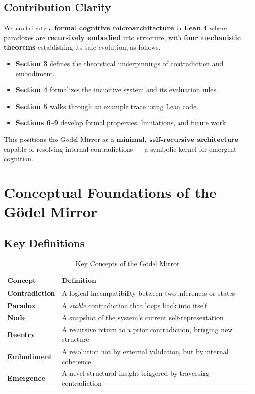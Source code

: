 \documentclass[manuscript,nonacm]{acmart}
\begin{document}
\subsection{Contribution Clarity}
We contribute a \textbf{formal cognitive microarchitecture} in \textbf{Lean 4} where paradoxes are \textbf{recursively embodied} into structure, with \textbf{four mechanistic theorems} establishing its safe evolution, as follows.

\begin{itemize}
\item \textbf{Section 3} defines the theoretical underpinnings of contradiction and embodiment.
\item \textbf{Section 4} formalizes the inductive system and its evaluation rules.
\item \textbf{Section 5} walks through an example trace using Lean code.
\item \textbf{Sections 6–9} develop formal properties, limitations, and future work.
\end{itemize}

This positions the Gödel Mirror as a \textbf{minimal, self-recursive architecture} capable of resolving internal contradictions — a symbolic kernel for emergent cognition.

\section{Conceptual Foundations of the Gödel Mirror}

\subsection{Key Definitions}

\begin{table}[H]
  \caption{Key Concepts of the Gödel Mirror}
  \label{tab:key-concepts}
  \begin{tabular}{@{}ll@{}}
    \toprule
    \textbf{Concept} & \textbf{Definition} \\
    \midrule
    \textbf{Contradiction} & A logical incompatibility between two inferences or states \\
    \textbf{Paradox} & A \textit{stable} contradiction that loops back into itself \\
    \textbf{Node} & A snapshot of the system's current self-representation \\
    \textbf{Reentry} & A recursive return to a prior contradiction, bringing new structure \\
    \textbf{Embodiment} & A resolution not by external validation, but by internal coherence \\
    \textbf{Emergence} & A novel structural insight triggered by traversing contradiction \\
    \bottomrule
  \end{tabular}
\end{table}
\end{document}

